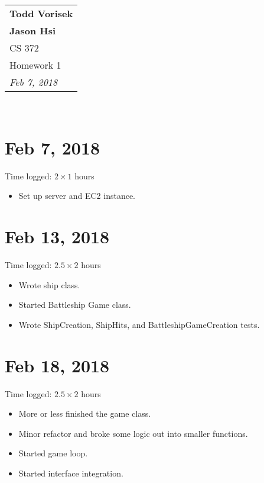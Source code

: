\documentclass{article}
\begin{document}
  \null\hfill
  \begin{tabular}[t]{l@{}}
    \textbf{Todd Vorisek}\\
    \textbf{Jason Hsi} \\
    CS 372 \\
    Homework 1\\
    \textit{Feb 7, 2018} \\
  \end{tabular}\\

  \section*{Feb 7, 2018}
    Time logged: $2 \times 1 $ hours
    \begin{itemize}
      \item Set up server and EC2 instance.
    \end{itemize}

  \section*{Feb 13, 2018}
    Time logged: $2.5 \times 2 $ hours
    \begin{itemize}
      \item Wrote ship class. 
      \item Started Battleship Game class. 
      \item Wrote ShipCreation, ShipHits, and BattleshipGameCreation tests.
    \end{itemize}

  \section*{Feb 18, 2018}
    Time logged: $2.5 \times 2 $ hours
    \begin{itemize}
      \item More or less finished the game class.
      \item Minor refactor and broke some logic out into smaller functions.
      \item Started game loop.
      \item Started interface integration.
    \end{itemize}
\end{document}
